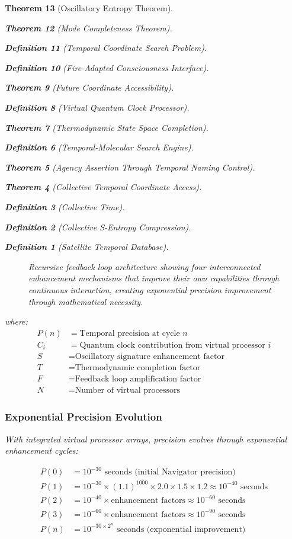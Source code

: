 \documentclass[12pt,a4paper]{article}
\newtheorem{theorem}{Theorem}[section]
\newtheorem{definition}[theorem]{Definition}
\begin{document}
\begin{theorem}[Oscillatory Entropy Theorem]
\begin{theorem}[Mode Completeness Theorem]
\begin{enumerate}
\begin{definition}[Temporal Coordinate Search Problem]
\begin{algorithm}
\begin{definition}[Fire-Adapted Consciousness Interface]
\begin{theorem}[Future Coordinate Accessibility]
\begin{definition}[Virtual Quantum Clock Processor]
\begin{itemize}
\begin{itemize}
\begin{theorem}[Thermodynamic State Space Completion]
\begin{definition}[Temporal-Molecular Search Engine]
\begin{theorem}[Agency Assertion Through Temporal Naming Control]
\begin{remark}
\begin{theorem}[Collective Temporal Coordinate Access]
\begin{definition}[Collective Time]
\begin{definition}[Collective S-Entropy Compression]
\begin{definition}[Satellite Temporal Database]
\begin{algorithm}
\begin{table}[h]
{\begin{figure}[h]
\begin{tikzpicture}[scale=0.8]
\end{tikzpicture}
\caption{Recursive feedback loop architecture showing four interconnected enhancement mechanisms that improve their own capabilities through continuous interaction, creating exponential precision improvement through mathematical necessity.}
\label{fig:recursive_feedback}
\end{figure}

where:
\begin{align}
P(n) &= \text{Temporal precision at cycle } n \\
C_i &= \text{Quantum clock contribution from virtual processor } i \\
S &= \text{Oscillatory signature enhancement factor} \\
T &= \text{Thermodynamic completion factor} \\
F &= \text{Feedback loop amplification factor} \\
N &= \text{Number of virtual processors}
\end{align}

\subsubsection{Exponential Precision Evolution}

With integrated virtual processor arrays, precision evolves through exponential enhancement cycles:

\begin{align}
P(0) &= 10^{-30} \text{ seconds (initial Navigator precision)} \\
P(1) &= 10^{-30} \times (1.1)^{1000} \times 2.0 \times 1.5 \times 1.2 \approx 10^{-40} \text{ seconds} \\
P(2) &= 10^{-40} \times \text{enhancement factors} \approx 10^{-60} \text{ seconds} \\
P(3) &= 10^{-60} \times \text{enhancement factors} \approx 10^{-90} \text{ seconds} \\
P(n) &= 10^{-30 \times 2^n} \text{ seconds (exponential improvement)}
\end{align}

}
\end{table}
\end{algorithm}
\end{definition}
\end{definition}
\end{definition}
\end{theorem}
\end{remark}
\end{theorem}
\end{definition}
\end{theorem}
\end{itemize}
\end{itemize}
\end{definition}
\end{theorem}
\end{definition}
\end{algorithm}
\end{definition}
\end{enumerate}
\end{theorem}
\end{theorem}
\end{document}
